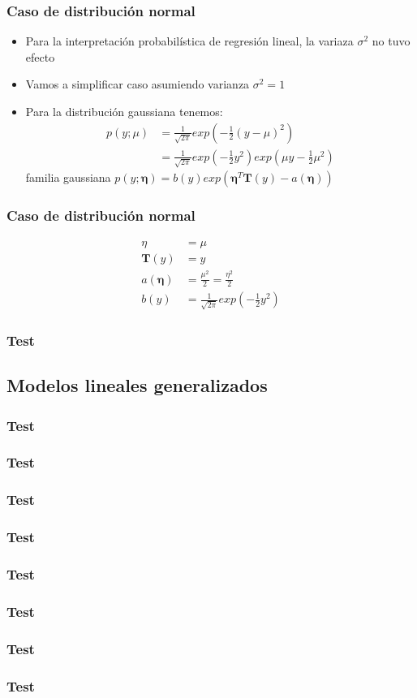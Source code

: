 \documentclass[10pt]{beamer}
\begin{document}
\begin{frame}
  \frametitle{Caso de distribución normal}
  \begin{itemize}
  \item Para la interpretación probabilística de regresión lineal, la variaza $\sigma^2$ no tuvo efecto
  \item Vamos a simplificar caso asumiendo varianza $\sigma^2=1$
  \item Para la distribución gaussiana tenemos:
  \begin{equation*}
  \begin{split}
   p(y; \mu) &= \frac{1}{\sqrt{2\pi}} exp \left( -\frac{1}{2} (y-\mu)^2 \right) \\
   &=\frac{1}{\sqrt{2\pi}} exp \left( -\frac{1}{2}y^2 \right)  exp \left(\mu y -\frac{1}{2}\mu^2 \right) 
  \end{split}
  \end{equation*}
  familia gaussiana $  p(y;\boldsymbol{\eta})= b(y)exp(\boldsymbol{\eta}^T \boldsymbol{T}(y)-a(\boldsymbol{\eta}))$
  \end{itemize}
\end{frame}
\begin{frame}
  \frametitle{Caso de distribución normal}
  \begin{align*}
  \eta&=\mu \\
  \boldsymbol{T}(y)&= y\\
  a(\boldsymbol{\eta})&=\frac{\mu^2}{2}=\frac{\eta^2}{2}\\
  b(y)&=\frac{1}{\sqrt{2\pi}}exp \left( -\frac{1}{2}y^2\right) 
  \end{align*}
\end{frame}
\begin{frame}
  \frametitle{Test}
\end{frame}
\subsection{Modelos lineales generalizados}
\begin{frame}
  \frametitle{Test}
\end{frame}
\begin{frame}
  \frametitle{Test}
\end{frame}
\begin{frame}
  \frametitle{Test}
\end{frame}
\begin{frame}
  \frametitle{Test}
\end{frame}
\begin{frame}
  \frametitle{Test}
\end{frame}
\begin{frame}
  \frametitle{Test}
\end{frame}
\begin{frame}
  \frametitle{Test}
\end{frame}
\begin{frame}
  \frametitle{Test}
\end{frame}
\end{document}
